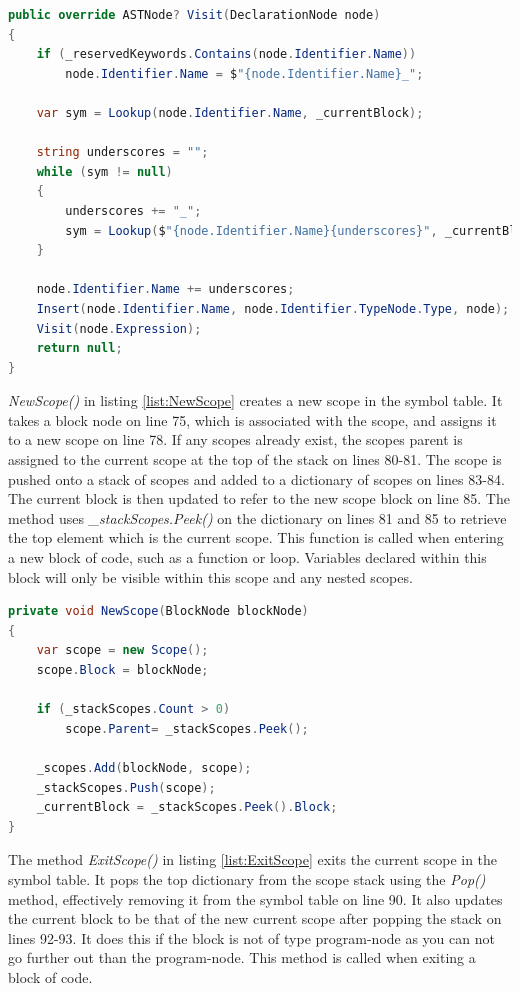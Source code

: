 \begin{lstlisting}[language = csharp, firstnumber=232, label={list:Visit},caption=Visit(DeclarationNode node) - CobraCompiler/SymbolTable.cs]
public override ASTNode? Visit(DeclarationNode node)
{
    if (_reservedKeywords.Contains(node.Identifier.Name))
        node.Identifier.Name = $"{node.Identifier.Name}_";

    var sym = Lookup(node.Identifier.Name, _currentBlock);

    string underscores = "";
    while (sym != null)
    {
        underscores += "_";
        sym = Lookup($"{node.Identifier.Name}{underscores}", _currentBlock);
    }

    node.Identifier.Name += underscores;
    Insert(node.Identifier.Name, node.Identifier.TypeNode.Type, node);
    Visit(node.Expression);
    return null;
}
\end{lstlisting}

\noindent
\textit{NewScope()} in listing \ref{list:NewScope} creates a new scope in the symbol table. It takes a block node on line 75, which is associated with the scope, and assigns it to a new scope on line 78. If any scopes already exist, the scopes parent is assigned to the current scope at the top of the stack on lines 80-81. The scope is pushed onto a stack of scopes and added to a dictionary of scopes on lines 83-84. The current block is then updated to refer to the new scope block on line 85. The method uses \textit{\_stackScopes.Peek()} on the dictionary on lines 81 and 85 to retrieve the top element which is the current scope. This function is called when entering a new block of code, such as a function or loop. Variables declared within this block will only be visible within this scope and any nested scopes.

\begin{lstlisting}[language = csharp, firstnumber=75, label={list:NewScope},caption=NewScope() - CobraCompiler/SymbolTable.cs]
private void NewScope(BlockNode blockNode)
{
    var scope = new Scope();
    scope.Block = blockNode;

    if (_stackScopes.Count > 0)
        scope.Parent= _stackScopes.Peek();

    _scopes.Add(blockNode, scope);
    _stackScopes.Push(scope);
    _currentBlock = _stackScopes.Peek().Block;
}
\end{lstlisting}

\noindent
The method \textit{ExitScope()} in listing \ref{list:ExitScope} exits the current scope in the symbol table. It pops the top dictionary from the scope stack using the \textit{Pop()} method, effectively removing it from the symbol table on line 90. It also updates the current block to be that of the new current scope after popping the stack on lines 92-93. It does this if the block is not of type program-node as you can not go further out than the program-node. This method is called when exiting a block of code.


